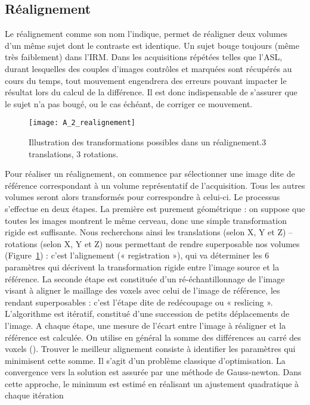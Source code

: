 \subsection{Réalignement}
Le réalignement comme son nom l’indique, permet de réaligner deux volumes d’un même
sujet dont le contraste est identique. Un sujet bouge toujours (même très faiblement) dans l’IRM. Dans
les acquisitions répétées telles que l’ASL, durant lesquelles des couples d’images contrôles et
marquées sont récupérés au cours du temps, tout mouvement engendrera des erreurs pouvant
impacter le résultat lors du calcul de la différence. Il est donc indispensable de s’assurer que le sujet
n’a pas bougé, ou le cas échéant, de corriger ce mouvement.\\
\begin{figure}[!t]
\centering
\texttt{[image: A\_2\_realignement]}
\caption{Illustration des transformations possibles dans un réalignement.3 translations, 3 rotations.}
\label{fig:A_2_realignement}	
\end{figure}
Pour réaliser un réalignement, on commence par sélectionner une image dite de référence
correspondant à un volume représentatif de l’acquisition. Tous les autres volumes seront alors
transformés pour correspondre à celui-ci. Le processus s’effectue en deux étapes. La première est
purement géométrique : on suppose que toutes les images montrent le même cerveau, donc une
simple transformation rigide est suffisante. Nous recherchons ainsi les translations (selon X, Y et Z) –
rotations (selon X, Y et Z) nous permettant de rendre superposable nos volumes (Figure~\ref{fig:A_2_realignement}) : c’est
l’alignement (« registration »), qui va déterminer les 6 paramètres qui décrivent la transformation
rigide entre l’image source et la référence. La seconde étape est constituée d’un ré-échantillonnage
de l’image visant à aligner le maillage des voxels avec celui de l’image de référence, les rendant
superposables : c’est l’étape dite de redécoupage ou « reslicing ».\\
L’algorithme est itératif, constitué d’une succession de petits déplacements de l’image. A
chaque étape, une mesure de l’écart entre l’image à réaligner et la référence est calculée. On utilise
en général la somme des différences au carré des voxels (\cite{Ashburner1997}). Trouver le meilleur alignement consiste
à identifier les paramètres qui minimisent cette somme. Il s’agit d’un problème classique
d’optimisation. La convergence vers la solution est assurée par une méthode de Gauss-newton. Dans
cette approche, le minimum est estimé en réalisant un ajustement quadratique à chaque itération
